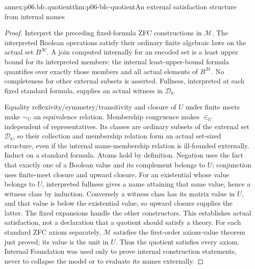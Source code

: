 \begin{annexitem}{annex:p06.bfc.quotient}{thm:p06-bfc-quotient}{An external satisfaction structure from internal names}
\begin{proof}
Interpret the preceding fixed-formula ZFC constructions in \(\mathcal M\).
The interpreted Boolean operations satisfy their ordinary finite algebraic
laws on the actual set \(B^{\mathcal M}\). A join computed internally
for an encoded set is a least upper bound for its interpreted members:
the internal least-upper-bound formula quantifies over exactly those members
and all actual elements of \(B^{\mathcal M}\). No completeness for
other external subsets is asserted. Fullness, interpreted at each fixed
standard formula, supplies an actual witness in \(\mathcal D_b\).

Equality reflexivity/symmetry/transitivity and closure of \(U\) under
finite meets make \(\sim_U\) an equivalence relation. Membership congruence
makes \(\in_U\) independent of representatives. Its classes are ordinary
subsets of the external set \(\mathcal D_b\), so their collection and
membership relation form an actual set-sized structure, even if the
internal name-membership relation is ill-founded externally.
Induct on a standard formula. Atoms hold by definition. Negation uses
the fact that exactly one of a Boolean value and its complement belongs
to \(U\); conjunction uses finite-meet closure and upward closure.
For an existential whose value belongs to \(U\), interpreted fullness
gives a name attaining that same value, hence a witness class by induction.
Conversely a witness class has its matrix value in \(U\), and that value
is below the existential value, so upward closure supplies the latter.
The fixed expansions handle the other constructors. This establishes actual
satisfaction, not a declaration that a quotient should satisfy a theory.
For each standard ZFC axiom separately, \(\mathcal M\) satisfies the
first-order axiom-value theorem just proved; its value is the unit in \(U\).
Thus the quotient satisfies every axiom. Internal Foundation was used only
to prove internal construction statements, never to collapse the model or
to evaluate its names externally.
\end{proof}
\end{annexitem}

